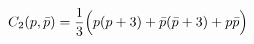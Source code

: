 \begin{equation}
C_2(p,\bar p)={1\over 3}\Bigr(p(p+3) + \bar p(\bar p+3) + p\bar p\Bigl)
\label{SU3Casimir}
\end{equation}

